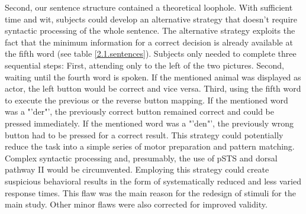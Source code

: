 Second, our sentence structure contained a theoretical loophole.
With sufficient time and wit, subjects could develop an alternative strategy that doesn't require syntactic processing of the whole sentence.
The alternative strategy exploits the fact that the minimum information for a correct decision is already available at the fifth word (see table \ref{2.1.sentences}).
Subjects only needed to complete three sequential steps:
First, attending only to the left of the two pictures.
Second, waiting until the fourth word is spoken.
If the mentioned animal was displayed as actor, the left button would be correct and vice versa.
Third, using the fifth word to execute the previous or the reverse button mapping.
If the mentioned word was a "'der"', the previously correct button remained correct and could be pressed immediately.
If the mentioned word was a "'den"', the previously wrong button had to be pressed for a correct result.
This strategy could potentially reduce the task into a simple series of motor preparation and pattern matching.
Complex syntactic processing and, presumably, the use of pSTS and dorsal pathway II would be circumvented.
Employing this strategy could create suspicious behavioral results in the form of systematically reduced and less varied response times.
This flaw was the main reason for the redesign of stimuli for the main study.
Other minor flaws were also corrected for improved validity.
